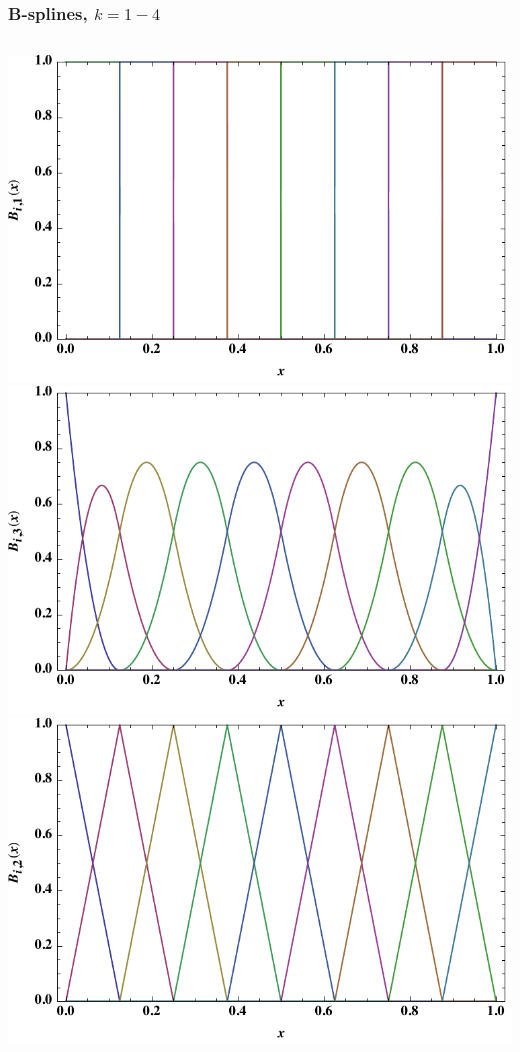 \documentclass[hideothersubsections]{beamer}
\begin{document}
\begin{frame}
\frametitle{B-splines, $k=1-4$}
\begin{columns}
	\centering
	\includegraphics[width=1.0\linewidth]{bsp1.pdf}\\
	\includegraphics[width=1.0\linewidth]{bsp3.pdf}
	\centering
	\includegraphics[width=1.0\linewidth]{bsp2.pdf}\\

\end{columns}
\end{frame}
\end{document}
